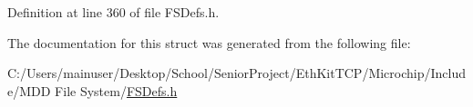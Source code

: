 Definition at line 360 of file F\+S\+Defs.\+h.



The documentation for this struct was generated from the following file\+:\begin{DoxyCompactItemize}
\item 
C\+:/\+Users/mainuser/\+Desktop/\+School/\+Senior\+Project/\+Eth\+Kit\+T\+C\+P/\+Microchip/\+Include/\+M\+D\+D File System/\hyperlink{_f_s_defs_8h}{F\+S\+Defs.\+h}\end{DoxyCompactItemize}
